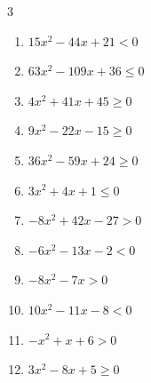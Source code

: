 \begin{multicols}{3}
\begin{enumerate}

  \item $15x^{2}-44x+21<0$


  \item $63x^{2}-109x+36\leq 0$


  \item $4x^{2}+41x+45\geq 0$


  \item $9x^{2}-22x-15\geq 0$


\columnbreak %

  \item $36x^{2}-59x+24\geq 0$


  \item $3x^{2}+4x+1\leq 0$


  \item $-8x^{2}+42x-27>0$


  \item $-6x^{2}-13x-2<0$


  \item $-8x^{2}-7x>0$


  \item $10x^{2}-11x-8<0$


  \item $-x^{2}+x+6>0$

        \phantom{$\displaystyle -2 < x < 3$}

  \item $3x^{2}-8x+5\geq 0$


\end{enumerate}
\end{multicols}
